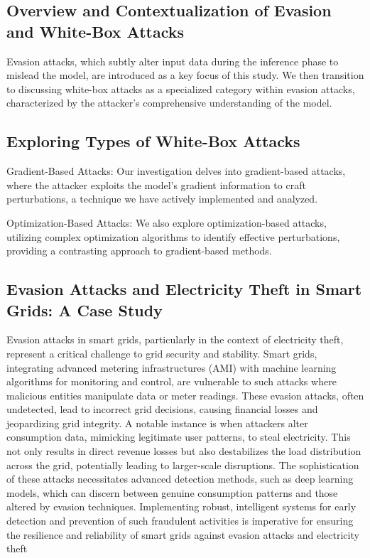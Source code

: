 \documentclass[10pt, conference, a4paper, final]{IEEEtran}
\begin{document}
\subsection{Overview and Contextualization of Evasion and White-Box Attacks}

Evasion attacks, which subtly alter input data during the inference phase to mislead the model, are introduced as a key focus of this study. We then transition to discussing white-box attacks as a specialized category within evasion attacks, characterized by the attacker's comprehensive understanding of the model.

\subsection{Exploring Types of White-Box Attacks}

Gradient-Based Attacks: Our investigation delves into gradient-based attacks, where the attacker exploits the model's gradient information to craft perturbations, a technique we have actively implemented and analyzed.

Optimization-Based Attacks: We also explore optimization-based attacks, utilizing complex optimization algorithms to identify effective perturbations, providing a contrasting approach to gradient-based methods.

\subsection{Evasion Attacks and Electricity Theft in Smart Grids: A Case Study}
Evasion attacks in smart grids, particularly in the context of electricity theft, represent a critical challenge to grid security and stability. Smart grids, integrating advanced metering infrastructures (AMI) with machine learning algorithms for monitoring and control, are vulnerable to such attacks where malicious entities manipulate data or meter readings. These evasion attacks, often undetected, lead to incorrect grid decisions, causing financial losses and jeopardizing grid integrity. A notable instance is when attackers alter consumption data, mimicking legitimate user patterns, to steal electricity. This not only results in direct revenue losses but also destabilizes the load distribution across the grid, potentially leading to larger-scale disruptions. The sophistication of these attacks necessitates advanced detection methods, such as deep learning models, which can discern between genuine consumption patterns and those altered by evasion techniques. Implementing robust, intelligent systems for early detection and prevention of such fraudulent activities is imperative for ensuring the resilience and reliability of smart grids against evasion attacks and electricity theft 
\end{document}
